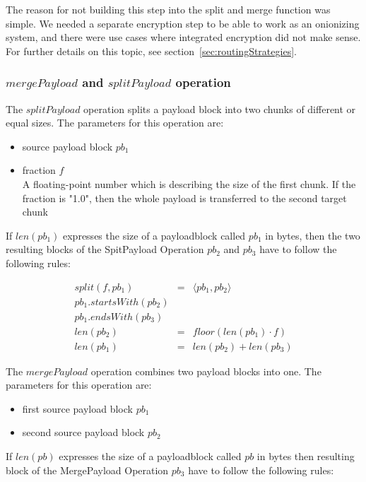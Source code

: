 The reason for not building this step into the split and merge function was simple. We needed a separate encryption step to be able to work as an onionizing system, and there were use cases where integrated encryption did not make sense. For further details on this topic, see section~\ref{sec:routingStrategies}.


\subsubsection{$mergePayload$ and $splitPayload$ operation}
The $splitPayload$ operation splits a payload block into two chunks of different or equal sizes. The parameters for this operation are:

\begin{itemize}
	\item source payload block $pb_1$
	\item fraction $f$\\
	A floating-point number which is describing the size of the first chunk. If the fraction is "1.0", then the whole payload is transferred to the second target chunk
\end{itemize}

If $len(pb_1)$ expresses the size of a payloadblock called $pb_1$ in bytes, then the two resulting blocks of the SpitPayload Operation $pb_2$ and $pb_3$ have to follow the following rules:

\begin{eqnarray}
split(f, pb_1) & = &\langle pb_1, pb_2 \rangle\\
pb_1.startsWith(pb_2)\\
pb_1.endsWith(pb_3)\\
len(pb_2) & = & floor(len(pb_1)\cdot f)\\
len(pb_1) & = & len(pb_2) + len(pb_3)
\end{eqnarray}

The $mergePayload$ operation combines two payload blocks into one. The parameters for this operation are:

\begin{itemize}
	\item first source payload block $pb_1$
	\item second source payload block $pb_2$
\end{itemize}

If $len(pb)$ expresses the size of a payloadblock called $pb$ in bytes then resulting block of the MergePayload Operation $pb_3$ have to follow the following rules:

